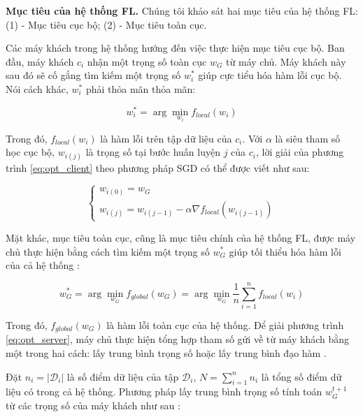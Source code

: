 \textbf{Mục tiêu của hệ thống FL.} Chúng tôi khảo sát hai mục tiêu của hệ thống FL: (1) - Mục tiêu cục bộ; (2) - Mục tiêu toàn cục.

Các máy khách trong hệ thống hướng đến việc thực hiện mục tiêu cục bộ. Ban đầu, máy khách $c_i$ nhận một trọng số toàn cục $w_G$ từ máy chủ. Máy khách này sau đó sẽ cố gắng tìm kiếm một trọng số $w_i^*$ giúp cực tiểu hóa hàm lỗi cục bộ. Nói cách khác, $w_i^*$ phải thỏa mãn thỏa mãn:

\begin{equation}
    \label{eq:opt_client}
    w_i^* = \arg\min_{w_i}{f_{local}(w_i)}
\end{equation}

Trong đó, $f_{local}(w_i)$ là hàm lỗi trên tập dữ liệu của $c_i$. Với $\alpha$ là siêu tham số học cục bộ, $w_{i(j)}$ là trọng số tại bước huấn luyện $j$ của $c_i$, lời giải của phương trình \ref{eq:opt_client} theo phương pháp SGD có thể được viết như sau:

\begin{equation}
    \begin{cases}
        w_{i(0)} = w_G\\
        w_{i(j)} = w_{i(j-1)} - \alpha \nabla f_{local}(w_{i(j-1)})
    \end{cases}
\end{equation}

Mặt khác, mục tiêu toàn cục, cũng là mục tiêu chính của hệ thống FL, được máy chủ thực hiện bằng cách tìm kiếm một trọng số $w_G^*$ giúp tối thiểu hóa hàm lỗi của cả hệ thống \cite{yin2021comprehensive}:

\begin{dmath}
    \label{eq:opt_server}
    w_G^* = \arg \min_{w_G}{f_{global}(w_G)}
        = \arg \min_{w_G}{\frac{1}{n} \sum_{i=1}^n{f_{local}(w_i)}}
\end{dmath}

Trong đó, $f_{global}(w_G)$ là hàm lỗi toàn cục của hệ thống. Để giải phương trình \ref{eq:opt_server}, máy chủ thực hiện tổng hợp tham số gửi về từ máy khách bằng một trong hai cách: lấy trung bình trọng số \parencite{mcmahan2017communication, aono2017privacy, yoon2021fedmix} hoặc lấy trung bình đạo hàm \parencite{chen2018federated, mcmahan2017learning}.

Đặt $n_i = |\mathcal{D}_i|$ là số điểm dữ liệu của tập $\mathcal{D}_i$, $N = \sum_{i=1}^n{n_i}$ là tổng số điểm dữ liệu có trong cả hệ thống. Phương pháp lấy trung bình trọng số tính toán $w_G^{t+1}$ từ các trọng số của máy khách như sau \cite{mcmahan2017communication}:

